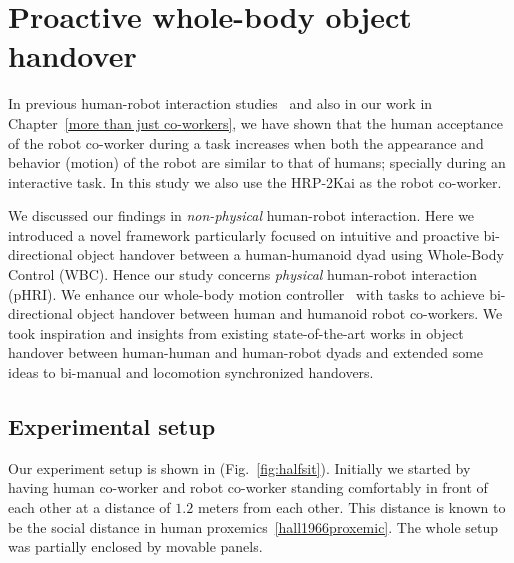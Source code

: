 	
{\color{blue}\chapter{Proactive whole-body object handover}\label{handover chapter}}


In previous human-robot interaction studies~\cite{huber2008human, strabala2013toward, shibata1995experimental} and also in our work in Chapter~\ref{more than just co-workers}, we have shown that the human acceptance of the robot co-worker during a task increases when both the appearance and behavior (motion) of the robot are similar to that of humans; specially during an interactive task. In this study we also use the HRP-2Kai as the robot co-worker.

We discussed our findings in \textit{non-physical} human-robot interaction. Here we introduced a novel framework particularly focused on intuitive and proactive bi-directional object handover between a human-humanoid dyad using Whole-Body Control (WBC). Hence our study concerns \textit{physical} human-robot interaction (pHRI). We enhance our whole-body motion controller~\cite{bouyarmane2018quadratic} with tasks to achieve bi-directional object handover between human and humanoid robot co-workers. We took inspiration and insights from existing state-of-the-art works in object handover between human-human and human-robot dyads and extended some ideas to bi-manual and locomotion synchronized handovers.



\section{Experimental setup}

Our experiment setup is shown in (Fig.~\ref{fig:halfsit}). Initially we started by having human co-worker and robot co-worker standing comfortably in front of each other at a distance of $1.2$ meters from each other. This distance is known to be the social distance in human proxemics~\ref{hall1966proxemic}. The whole setup was partially enclosed by movable panels.

